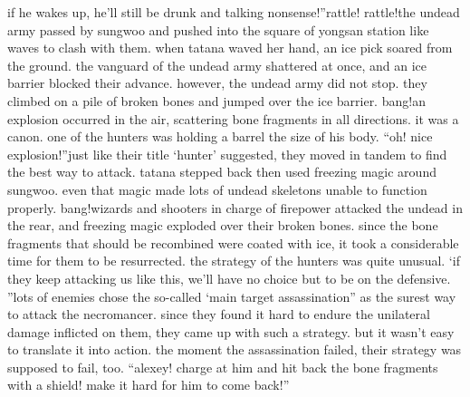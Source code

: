  if he wakes up, he’ll still be drunk and talking nonsense!”rattle! rattle!the undead army passed by sungwoo and pushed into the square of yongsan station like waves to clash with them.
when tatana waved her hand, an ice pick soared from the ground.
 the vanguard of the undead army shattered at once, and an ice barrier blocked their advance.
however, the undead army did not stop.
 they climbed on a pile of broken bones and jumped over the ice barrier.
bang!an explosion occurred in the air, scattering bone fragments in all directions.
 it was a canon.
 one of the hunters was holding a barrel the size of his body.
“oh! nice explosion!”just like their title ‘hunter’ suggested, they moved in tandem to find the best way to attack.
tatana stepped back then used freezing magic around sungwoo.
 even that magic made lots of undead skeletons unable to function properly.
bang!wizards and shooters in charge of firepower attacked the undead in the rear, and freezing magic exploded over their broken bones.
since the bone fragments that should be recombined were coated with ice, it took a considerable time for them to be resurrected.
the strategy of the hunters was quite unusual.
‘if they keep attacking us like this, we’ll have no choice but to be on the defensive.
”lots of enemies chose the so-called ‘main target assassination” as the surest way to attack the necromancer.
 since they found it hard to endure the unilateral damage inflicted on them, they came up with such a strategy.
but it wasn’t easy to translate it into action.
 the moment the assassination failed, their strategy was supposed to fail, too.
“alexey! charge at him and hit back the bone fragments with a shield! make it hard for him to come back!”

